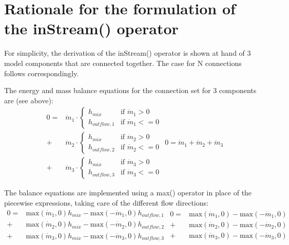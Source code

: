 \documentclass[10pt,a4paper]{report}
\def\doublelabel#1{\label{#1}}
\begin{document}
\section{Rationale for the formulation of the inStream() operator}\doublelabel{rationale-for-the-formulation-of-the-instream-operator}

For simplicity, the derivation of the inStream() operator is shown at
hand of 3 model components that are connected together. The case for N
connections follows correspondingly.

The energy and mass balance equations for the connection set for 3
components are (see above):
\begin{subequations}
\begin{equation}
\begin{split}
0=&\dot{m}_1\cdot
\begin{cases}
h_{mix}&\text{if $\dot{m}_1>0$}\\
h_{outflow,1}&\text{if $\dot{m}_1<=0$}
\end{cases}\\
+&\dot{m}_2\cdot
\begin{cases}
h_{mix}&\text{if $\dot{m}_2>0$}\\
h_{outflow,2}&\text{if $\dot{m}_2<=0$}
\end{cases}\\
+&\dot{m}_3\cdot
\begin{cases}
h_{mix}&\text{if $\dot{m}_3>0$}\\
h_{outflow,3}&\text{if $\dot{m}_3<=0$}
\end{cases}
\end{split}
\label{D1a}
\end{equation}
\begin{equation}
0=\dot{m}_1+\dot{m}_2+\dot{m}_3
\label{D1b}
\end{equation}
\label{D1}
\end{subequations}

The balance equations are implemented using a max() operator in place of
the piecewise expressions, taking care of the different flow directions:
\begin{subequations}
\begin{equation}
\begin{split}
0=&\text{max}(\dot{m}_1,0)h_{mix}-\text{max}(-\dot{m}_1,0)h_{outflow,1}\\
+&\text{max}(\dot{m}_2,0)h_{mix}-\text{max}(-\dot{m}_2,0)h_{outflow,2}\\
+&\text{max}(\dot{m}_3,0)h_{mix}-\text{max}(-\dot{m}_3,0)h_{outflow,3}
\end{split}
\label{D2a}
\end{equation}

\begin{equation}
\begin{split}
0=&\text{max}(\dot{m}_1,0)-\text{max}(-\dot{m}_1,0)\\
+&\text{max}(\dot{m}_2,0)-\text{max}(-\dot{m}_2,0)\\
+&\text{max}(\dot{m}_3,0)-\text{max}(-\dot{m}_3,0)
\end{split}
\label{D2b}
\end{equation}
\label{D2}
\end{subequations}
\end{document}
